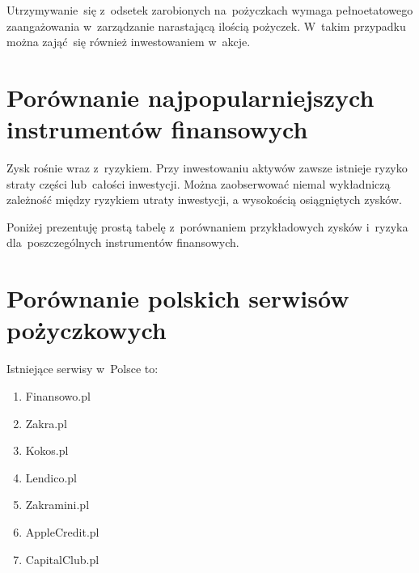 \documentclass[a4paper,twoside,titlepage,openright]{book}
\begin{document}
Utrzymywanie~się z~odsetek zarobionych na~pożyczkach wymaga pełnoetatowego zaangażowania w~zarządzanie narastającą ilością pożyczek. W~takim przypadku można zająć~się również inwestowaniem w~akcje.


\section{Porównanie najpopularniejszych instrumentów finansowych}

Zysk rośnie wraz z~ryzykiem. Przy inwestowaniu aktywów zawsze istnieje ryzyko straty części lub~całości inwestycji. Można zaobserwować niemal wykładniczą zależność między ryzykiem utraty inwestycji, a wysokością osiągniętych zysków. 

Poniżej prezentuję prostą tabelę z~porównaniem przykładowych zysków i~ryzyka dla~poszczególnych instrumentów finansowych. 

\begin{small}
\noindent
{}
\end{small}


\section{Porównanie polskich serwisów pożyczkowych}

Istniejące serwisy w~Polsce to:

\begin{enumerate}

	\item Finansowo.pl \cite{finansowoPl}
	\item Zakra.pl \cite{zakraPl}
	\item Kokos.pl \cite{kokosPl}
	\item Lendico.pl \cite{lendicoPl}
	\item Zakramini.pl \cite{zakraminiPl}
	\item AppleCredit.pl \cite{applecreditPl}
	\item CapitalClub.pl \cite{capitalclubPl}

\end{enumerate}
\end{document}
